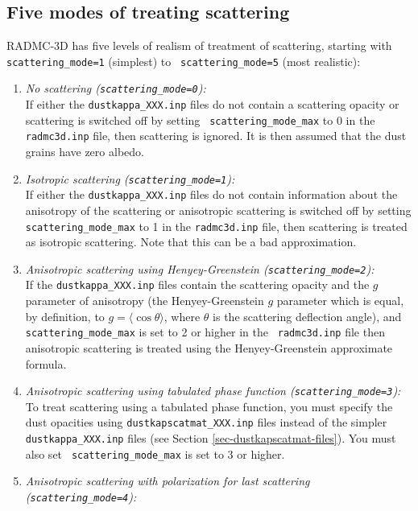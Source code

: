 \documentclass{report}
\begin{document}
\subsection{Five modes of treating scattering}
\label{sec-modes-of-scattering}
%
RADMC-3D has five levels of realism of treatment of scattering, starting
with {\small\tt scattering\_mode=1} (simplest) to {\small\tt
  scattering\_mode=5} (most realistic):
\begin{enumerate}
\item {\em No scattering ({\small\tt scattering\_mode=0}):}\\
  If either the {\small\tt dustkappa\_XXX.inp} files do not contain a
  scattering opacity or scattering is switched off by setting {\small\tt
    scattering\_mode\_max} to 0 in the {\small\tt radmc3d.inp} file, then
  scattering is ignored. It is then assumed that the dust grains have zero
  albedo.
\item {\em Isotropic scattering ({\small\tt scattering\_mode=1}):}\\
  If either the {\small\tt dustkappa\_XXX.inp} files do not contain
  information about the anisotropy of the scattering or anisotropic
  scattering is switched off by setting {\small\tt scattering\_mode\_max} to
  1 in the {\small\tt radmc3d.inp} file, then scattering is treated as
  isotropic scattering.  Note that this can be a bad approximation.
\item {\em Anisotropic scattering using Henyey-Greenstein ({\small\tt scattering\_mode=2}):}\\
  If the {\small\tt dustkappa\_XXX.inp} files contain the scattering opacity
  and the $g$ parameter of anisotropy (the Henyey-Greenstein $g$ parameter
  which is equal, by definition, to $g=\langle\cos\theta\rangle$, where
  $\theta$ is the scattering deflection angle), and {\small\tt
    scattering\_mode\_max} is set to 2 or higher in the {\small\tt
    radmc3d.inp} file then anisotropic scattering is treated using the
  Henyey-Greenstein approximate formula.
\item {\em Anisotropic scattering using tabulated phase function ({\small\tt scattering\_mode=3}):}\\
  To treat scattering using a tabulated phase function, you must specify the
  dust opacities using {\small\tt dustkapscatmat\_XXX.inp} files instead of the
  simpler {\small\tt dustkappa\_XXX.inp} files (see 
  Section \ref{sec-dustkapscatmat-files}). You must also set {\small\tt
    scattering\_mode\_max} is set to 3 or higher.
\item {\em Anisotropic scattering with polarization for last scattering ({\small\tt scattering\_mode=4}):}\\

\end{enumerate}
\end{document}
